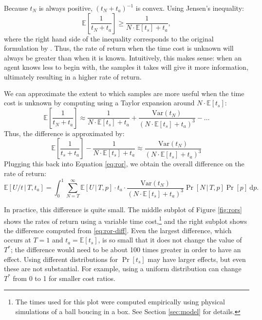 \documentclass[11pt]{article}
\begin{document}
Because $t_N$ is always positive, $(t_N+t_a)^{-1}$ is convex. Using Jensen's inequality:
\begin{equation}
\mathbb{E}\left[\frac{1}{t_N+t_a}\right]\geq \frac{1}{N\cdot{}\mathbb{E}[t_s]+t_a},
\end{equation}
where the right hand side of the inequality corresponds to the original formulation by . Thus, the rate of return when the time cost is unknown will always be greater than when it is known. Intuitively, this makes sense: when an agent knows less to begin with, the samples it takes will give it more information, ultimately resulting in a higher rate of return.

We can approximate the extent to which samples are more useful when the time cost is unknown by computing using a Taylor expansion around $N\cdot{}\mathbb{E}[t_s]$:
\begin{equation}
\mathbb{E}\left[\frac{1}{t_N+t_a}\right]\approx \frac{1}{N\cdot{}\mathbb{E}[t_s]+t_a}+\frac{\mathrm{Var}(t_N)}{(N\cdot{}\mathbb{E}[t_s]+t_a)^3}-\ldots{}
\end{equation}
Thus, the difference is approximated by:
\begin{equation}
\mathbb{E}\left[\frac{1}{t_s+t_a}\right]-\frac{1}{N\cdot{}\mathbb{E}[t_s]+t_a}\approx \frac{\mathrm{Var}(t_N)}{(N\cdot{}\mathbb{E}[t_s]+t_a)^3}
\end{equation}
Plugging this back into Equation \ref{eq:ror}, we obtain the overall difference on the rate of return:
\begin{equation}
\mathbb{E}[U/t\,|\,T,t_a]=\int_0^1 \sum_{N=T}^\infty \mathbb{E}[U\,|\,T,p]\cdot{}t_a\cdot{}\frac{\mathrm{Var}(t_N)}{(N\cdot{}\mathbb{E}[t_s]+t_a)^3}\Pr[N\,|\,T,p]\Pr[p]\ \mathrm{d}p.
\label{eq:ror-diff}
\end{equation}

In practice, this difference is quite small. The middle subplot of Figure \ref{fig:rors} shows the rates of return using a variable time cost,\footnote{The times used for this plot were computed empirically using physical simulations of a ball boucing in a box. See Section \ref{sec:model} for details.} and the right subplot shows the difference computed from \ref{eq:ror-diff}. Even the largest difference, which occurs at $T=1$ and $t_a=\mathbb{E}[t_s]$, is so small that it does not change the value of $T^*$; the difference would need to be about 100 times greater in order to have an effect. Using different distributions for $\Pr[t_s]$ may have larger effects, but even these are not substantial. For example, using a uniform distribution can change $T^*$ from 0 to 1 for smaller cost ratios.
\end{document}
